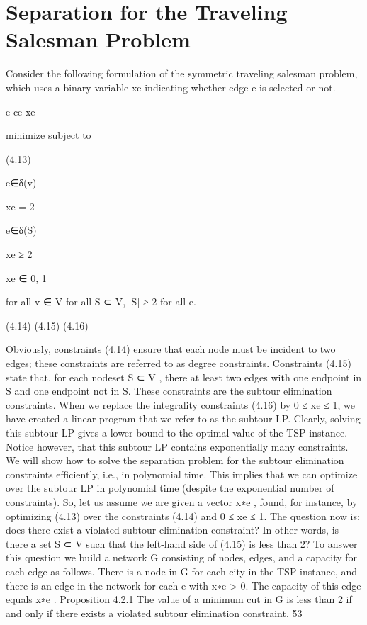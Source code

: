 \section{Separation for the Traveling Salesman Problem}

Consider the following formulation of the symmetric traveling salesman problem, which uses a binary
variable xe indicating whether edge e is selected or not.

e ce xe

minimize
subject to

(4.13)

e∈δ(v)

xe = 2

e∈δ(S)

xe ≥ 2

xe ∈ {0, 1}

for all v ∈ V
for all S ⊂ V, |S| ≥ 2
for all e.

(4.14)
(4.15)
(4.16)

Obviously, constraints (4.14) ensure that each node must be incident to two edges; these constraints are
referred to as degree constraints. Constraints (4.15) state that, for each nodeset S ⊂ V , there at least two
edges with one endpoint in S and one endpoint not in S. These constraints are the subtour elimination
constraints.
When we replace the integrality constraints (4.16) by 0 ≤ xe ≤ 1, we have created a linear program that
we refer to as the subtour LP. Clearly, solving this subtour LP gives a lower bound to the optimal value
of the TSP instance. Notice however, that this subtour LP contains exponentially many constraints. We
will show how to solve the separation problem for the subtour elimination constraints efficiently, i.e., in
polynomial time. This implies that we can optimize over the subtour LP in polynomial time (despite the
exponential number of constraints).
So, let us assume we are given a vector x∗e , found, for instance, by optimizing (4.13) over the constraints
(4.14) and 0 ≤ xe ≤ 1. The question now is: does there exist a violated subtour elimination constraint?
In other words, is there a set S ⊂ V such that the left-hand side of (4.15) is less than 2? To answer this
question we build a network G consisting of nodes, edges, and a capacity for each edge as follows. There
is a node in G for each city in the TSP-instance, and there is an edge in the network for each e with
x∗e > 0. The capacity of this edge equals x∗e .
Proposition 4.2.1 The value of a minimum cut in G is less than 2 if and only if there exists a violated
subtour elimination constraint.
53

